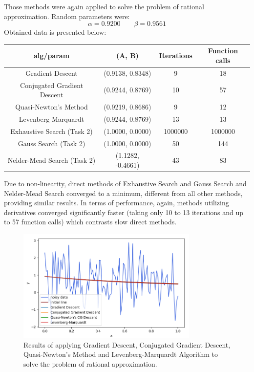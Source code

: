 \documentclass[12pt, a4paper]{article}
\begin{document}
\newpage

Those methods were again applied to solve the problem of rational approximation. Random parameters were:
\[ \alpha = 0.9200 \qquad \beta = 0.9561 \]
Obtained data is presented below:
\begin{center}
\begin{tabular}{cccc}
\hline
alg/param                   & (A, B)            & Iterations & Function calls \\ \hline
Gradient Descent            & (0.9138, 0.8348) & 9           & 18             \\
Conjugated Gradient Descent & (0.9244, 0.8769) & 10          & 57             \\
Quasi-Newton's Method       & (0.9219, 0.8686) & 9           & 12             \\
Levenberg-Marquardt         & (0.9244, 0.8769) & 13          & 13             \\ \hline
Exhaustive Search (Task 2)  & (1.0000, 0.0000)  & 1000000    & 1000000        \\
Gauss Search (Task 2)       & (1.0000, 0.0000)  & 50         & 144            \\
Nelder-Mead Search (Task 2) & (1.1282, -0.4661) & 43         & 83             \\ \hline
\end{tabular}
\end{center}
Due to non-linearity, direct methods of Exhaustive Search and Gauss Search and Nelder-Mead Search converged to a minimum, different from all other methods, providing similar results. In terms of performance, again, methods utilizing derivatives converged significantly faster (taking only 10 to 13 iterations and up to 57 function calls) which contrasts slow direct methods.

\begin{figure}[!h]
\centering
\includegraphics[width=0.8\textwidth]{rational.png}
\caption{Results of applying Gradient Descent, Conjugated Gradient Descent, Quasi-Newton's Method and Levenberg-Marquardt Algorithm to solve the problem of rational approximation.}
\end{figure}
\end{document}
